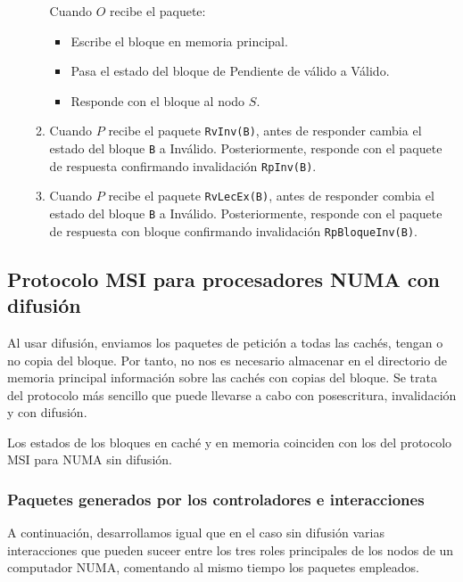 \begin{enumerate}
\begin{enumerate}
        Cuando $O$ recibe el paquete:
        \begin{itemize}
            \item Escribe el bloque en memoria principal.
            \item Pasa el estado del bloque de Pendiente de válido a Válido.
            \item Responde con el bloque al nodo $S$.
        \end{itemize}
        \item Cuando $P$ recibe el paquete \verb|RvInv(B)|, antes de responder cambia el estado del bloque \verb|B| a Inválido. Posteriormente, responde con el paquete de respuesta confirmando invalidación \verb|RpInv(B)|.
        \item Cuando $P$ recibe el paquete \verb|RvLecEx(B)|, antes de responder combia el estado del bloque \verb|B| a Inválido. Posteriormente, responde con el paquete de respuesta con bloque confirmando invalidación \verb|RpBloqueInv(B)|.
    \end{enumerate}
\end{enumerate}

\subsection{Protocolo MSI para procesadores NUMA con difusión}
Al usar difusión, enviamos los paquetes de petición a todas las cachés, tengan o no copia del bloque. Por tanto, no nos es necesario almacenar en el directorio de memoria principal información sobre las cachés con copias del bloque. Se trata del protocolo más sencillo que puede llevarse a cabo con posescritura, invalidación y con difusión.

Los estados de los bloques en caché y en memoria coinciden con los del protocolo MSI para NUMA sin difusión.

\subsubsection{Paquetes generados por los controladores e interacciones}
A continuación, desarrollamos igual que en el caso sin difusión varias interacciones que pueden suceer entre los tres roles principales de los nodos de un computador NUMA, comentando al mismo tiempo los paquetes empleados.

